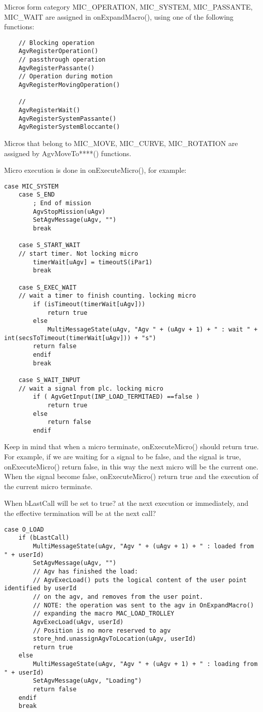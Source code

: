 Micros form category MIC\_OPERATION, MIC\_SYSTEM, MIC\_PASSANTE, MIC\_WAIT are assigned in onExpandMacro(), using one of the following functions:
\begin{lstlisting}
	// Blocking operation
	AgvRegisterOperation()
	// passthrough operation
	AgvRegisterPassante()
	// Operation during motion
	AgvRegisterMovingOperation()
	
	//
	AgvRegisterWait()
	AgvRegisterSystemPassante()
	AgvRegisterSystemBloccante()
\end{lstlisting}

Micros that belong to MIC\_MOVE, MIC\_CURVE, MIC\_ROTATION are assigned by AgvMoveTo****() functions.

Micro execution is done in onExecuteMicro(), for example:

\begin{lstlisting}
case MIC_SYSTEM
	case S_END
		; End of mission
		AgvStopMission(uAgv)
		SetAgvMessage(uAgv, "")
		break
		
	case S_START_WAIT
	// start timer. Not locking micro
		timerWait[uAgv] = timeoutS(iPar1)
		break
	
	case S_EXEC_WAIT
	// wait a timer to finish counting. locking micro
		if (isTimeout(timerWait[uAgv]))
			return true
		else
			MultiMessageState(uAgv, "Agv " + (uAgv + 1) + " : wait " + int(secsToTimeout(timerWait[uAgv])) + "s")
		return false
		endif
		break
	
	case S_WAIT_INPUT
	// wait a signal from plc. locking micro
		if ( AgvGetInput(INP_LOAD_TERMITAED) ==false )
			return true
		else
			return false
		endif

\end{lstlisting}

Keep in mind that when a micro terminate, onExecuteMicro() should return true. For example, if we are waiting for a signal to be false, and the signal is true, onExecuteMicro() return false, in this way the next micro will be the current one.
When the signal become false, onExecuteMicro() return true and the execution of the current micro terminate.

When bLastCall will be set to true? at the next execution or immediately, and the effective termination will be at the next call?


\begin{lstlisting}[caption= Loading MIC OPERATION , label=lstOLOAD ]
case O_LOAD
	if (bLastCall)
		MultiMessageState(uAgv, "Agv " + (uAgv + 1) + " : loaded from " + userId)
		SetAgvMessage(uAgv, "")
		// Agv has finished the load:
		// AgvExecLoad() puts the logical content of the user point identified by userId
		// on the agv, and removes from the user point.
		// NOTE: the operation was sent to the agv in OnExpandMacro()
		// expanding the macro MAC_LOAD_TROLLEY
		AgvExecLoad(uAgv, userId)
		// Position is no more reserved to agv
		store_hnd.unassignAgvToLocation(uAgv, userId)
		return true
	else
		MultiMessageState(uAgv, "Agv " + (uAgv + 1) + " : loading from " + userId)
		SetAgvMessage(uAgv, "Loading")
		return false
	endif
	break
\end{lstlisting}

